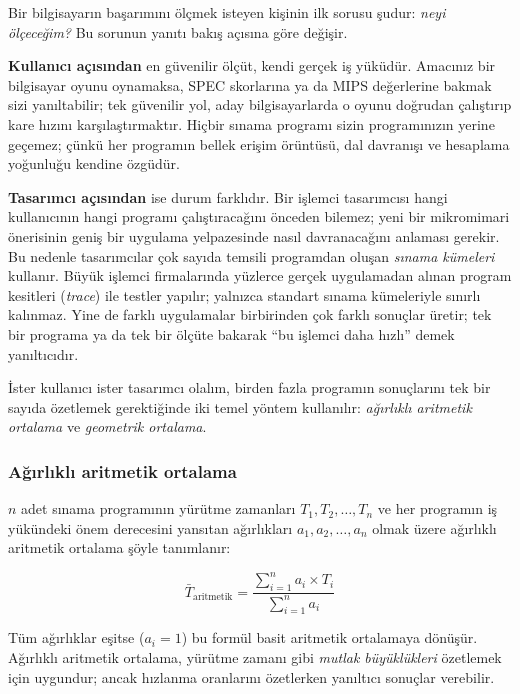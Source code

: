 Bir bilgisayarın başarımını ölçmek isteyen kişinin ilk sorusu şudur: \emph{neyi ölçeceğim?} Bu sorunun yanıtı bakış açısına göre değişir.

\textbf{Kullanıcı açısından} en güvenilir ölçüt, kendi gerçek iş yüküdür. Amacınız bir bilgisayar oyunu oynamaksa, SPEC skorlarına ya da MIPS değerlerine bakmak sizi yanıltabilir; tek güvenilir yol, aday bilgisayarlarda o oyunu doğrudan çalıştırıp kare hızını karşılaştırmaktır. Hiçbir sınama programı sizin programınızın yerine geçemez; çünkü her programın bellek erişim örüntüsü, dal davranışı ve hesaplama yoğunluğu kendine özgüdür.

\textbf{Tasarımcı açısından} ise durum farklıdır. Bir işlemci tasarımcısı hangi kullanıcının hangi programı çalıştıracağını önceden bilemez; yeni bir mikromimari önerisinin geniş bir uygulama yelpazesinde nasıl davranacağını anlaması gerekir. Bu nedenle tasarımcılar çok sayıda temsili programdan oluşan \emph{sınama kümeleri} kullanır. Büyük işlemci firmalarında yüzlerce gerçek uygulamadan alınan program kesitleri (\emph{trace}) ile testler yapılır; yalnızca standart sınama kümeleriyle sınırlı kalınmaz. Yine de farklı uygulamalar birbirinden çok farklı sonuçlar üretir; tek bir programa ya da tek bir ölçüte bakarak ``bu işlemci daha hızlı'' demek yanıltıcıdır.

İster kullanıcı ister tasarımcı olalım, birden fazla programın sonuçlarını tek bir sayıda özetlemek gerektiğinde iki temel yöntem kullanılır: \emph{ağırlıklı aritmetik ortalama} ve \emph{geometrik ortalama}.

\subsubsection*{Ağırlıklı aritmetik ortalama}

$n$ adet sınama programının yürütme zamanları $T_1, T_2, \ldots, T_n$ ve her programın iş yükündeki önem derecesini yansıtan ağırlıkları $a_1, a_2, \ldots, a_n$ olmak üzere ağırlıklı aritmetik ortalama şöyle tanımlanır:

\begin{equation}
\bar{T}_{\text{aritmetik}} = \frac{\sum_{i=1}^{n} a_i \times T_i}{\sum_{i=1}^{n} a_i}
\label{eq:agirlikli-ort}
\end{equation}

Tüm ağırlıklar eşitse ($a_i = 1$) bu formül basit aritmetik ortalamaya dönüşür. Ağırlıklı aritmetik ortalama, yürütme zamanı gibi \emph{mutlak büyüklükleri} özetlemek için uygundur; ancak hızlanma oranlarını özetlerken yanıltıcı sonuçlar verebilir.


